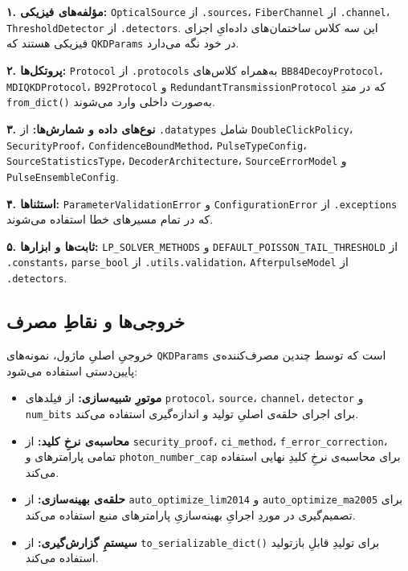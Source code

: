 \textbf{۱. مؤلفه‌های فیزیکی:} \texttt{OpticalSource} از \texttt{.sources}، \texttt{FiberChannel} از \texttt{.channel}، \texttt{ThresholdDetector} از \texttt{.detectors}. این سه کلاس ساختمان‌های داده‌ایِ اجزای فیزیکی هستند که \texttt{QKDParams} در خود نگه می‌دارد.

\textbf{۲. پروتکل‌ها:} \texttt{Protocol} از \texttt{.protocols} به‌همراه کلاس‌های \texttt{BB84DecoyProtocol}، \texttt{MDIQKDProtocol}، \texttt{B92Protocol} و \texttt{RedundantTransmissionProtocol} که در متدِ \texttt{from\_dict()} به‌صورت داخلی وارد می‌شوند.

\textbf{۳. نوع‌های داده و شمارش‌ها:} از \texttt{.datatypes} شامل \texttt{DoubleClickPolicy}، \texttt{SecurityProof}، \texttt{ConfidenceBoundMethod}، \texttt{PulseTypeConfig}، \texttt{SourceStatisticsType}، \texttt{DecoderArchitecture}، \texttt{SourceErrorModel} و \texttt{PulseEnsembleConfig}.

\textbf{۴. استثناها:} \texttt{ParameterValidationError} و \texttt{ConfigurationError} از \texttt{.exceptions} که در تمام مسیرهای خطا استفاده می‌شوند.

\textbf{۵. ثابت‌ها و ابزارها:} \texttt{LP\_SOLVER\_METHODS} و \texttt{DEFAULT\_POISSON\_TAIL\_THRESHOLD} از \texttt{.constants}، \texttt{parse\_bool} از \texttt{.utils.validation}، \texttt{AfterpulseModel} از \texttt{.detectors}.

\subsection{خروجی‌ها و نقاطِ مصرف}

خروجیِ اصلیِ ماژول، نمونه‌های \texttt{QKDParams} است که توسط چندین مصرف‌کننده‌ی پایین‌دستی استفاده می‌شود:

\begin{itemize}
	\item \textbf{موتورِ شبیه‌سازی:} از فیلدهای \texttt{protocol}، \texttt{source}، \texttt{channel}، \texttt{detector} و \texttt{num\_bits} برای اجرای حلقه‌ی اصلیِ تولید و اندازه‌گیری استفاده می‌کند.
	\item \textbf{محاسبه‌ی نرخِ کلید:} از \texttt{security\_proof}، \texttt{ci\_method}، \texttt{f\_error\_correction}، تمامی پارامترهای  و \texttt{photon\_number\_cap} برای محاسبه‌ی نرخِ کلیدِ نهایی استفاده می‌کند.
	\item \textbf{حلقه‌ی بهینه‌سازی:} از \texttt{auto\_optimize\_lim2014} و \texttt{auto\_optimize\_ma2005} برای تصمیم‌گیری در موردِ اجرایِ بهینه‌سازیِ پارامترهای منبع استفاده می‌کند.
	\item \textbf{سیستمِ گزارش‌گیری:} از \texttt{to\_serializable\_dict()} برای تولیدِ  قابلِ بازتولید استفاده می‌کند.
\end{itemize}

